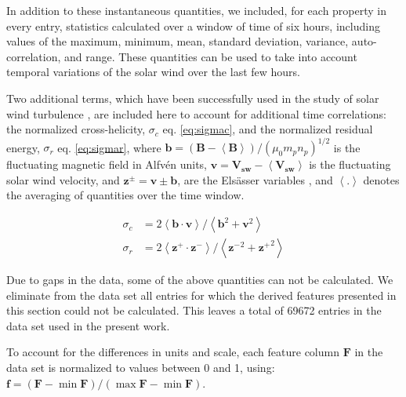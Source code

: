 In addition to these instantaneous quantities, we included, for each property in every entry, statistics calculated over a window of time of six hours, including values of the maximum, minimum, mean, standard deviation, variance, auto-correlation, and range. These quantities can be used to take into account temporal variations of the solar wind over the last few hours.

Two additional terms, which have been successfully used in the study of solar wind turbulence \citep{SEE ROBERTS REFS}, are included here to account for additional time correlations: the normalized cross-helicity, $\sigma_c$ eq. \eqref{eq:sigmac}, and the normalized residual energy, $\sigma_r$ eq. \eqref{eq:sigmar}, where $\boldsymbol{b} = \left(\boldsymbol{B}- \boldsymbol{\left<B\right>}\right)/(\mu_0m_pn_p)^{1/2}$ is the fluctuating magnetic field in Alfv\'en units, $\boldsymbol{v} = \boldsymbol{V_{sw}}- \boldsymbol{\left<V_{sw}\right>}$ is the fluctuating solar wind velocity, and $\boldsymbol{z^\pm} = \boldsymbol{v} \pm \boldsymbol{b}$, are the Els\"asser variables \citep{Elssaser1950, Magyar2019}, and $\left<.\right>$ denotes the averaging of quantities over the time window.

\begin{align}
\sigma_c & = 2 \left< \boldsymbol{b}\cdot\boldsymbol{v}\right>/\left<\boldsymbol{b}^2 + \boldsymbol{v}^2\right> \label{eq:sigmac} \\
\sigma_r & = 2 \left< \boldsymbol{z^+}\cdot\boldsymbol{z^-}\right>/\left<\boldsymbol{z^-}^2 + \boldsymbol{z^+}^2\right> \label{eq:sigmar}
\end{align}

Due to gaps in the data, some of the above quantities can not be calculated. We eliminate from the data set all entries for which the derived features presented in this section could not be calculated. This leaves a total of 69672 entries in the data set used in the present work.

To account for the differences in units and scale, each feature column $\boldsymbol{F}$ in the data set is normalized to values between 0 and 1, using: $\boldsymbol{f}=\left(\boldsymbol{F}-\min{\boldsymbol{F}}\right) /\left(\max{\boldsymbol{F}}-\min{\boldsymbol{F}}\right)$.

